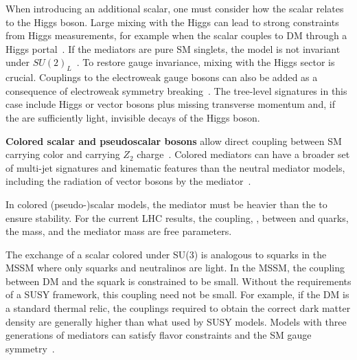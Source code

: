 When introducing an additional scalar, one must consider how the scalar relates to the Higgs boson. Large mixing with the Higgs can lead to strong constraints from Higgs measurements, for example when the scalar couples to DM through a Higgs portal~\cite{Berlin:2014cfa}. %
If the mediators are pure SM singlets, the model is not invariant under $SU(2)_L$~\cite{Bell:2016ekl}. 
To restore gauge invariance, mixing with the Higgs sector is crucial. 
Couplings to the electroweak gauge bosons can also be added as a consequence of electroweak symmetry breaking~\cite{Bauer:2016gys,Englert:2016joy}. The tree-level signatures in this case include Higgs or vector bosons plus missing transverse momentum and, if the \IP are sufficiently light, invisible decays of the Higgs boson.


\textbf{Colored scalar and pseudoscalar bosons} allow direct coupling between SM carrying color and \IP carrying $Z_2$ charge~\cite{Bai:2013iqa, Papucci:2014iwa, An:2013xka, Bell:2012rg}. Colored mediators can have a broader set of multi-jet signatures and kinematic features than the neutral mediator models, including the radiation of vector bosons by the mediator~\cite{Bell:2012rg}. 

In colored (pseudo-)scalar models, the mediator must be heavier than the \IP to ensure \IP stability. 
For the current LHC results, the coupling, \gdmq, between \IP and quarks, the \IP mass, and the mediator mass are free parameters. 

The exchange of a scalar colored under SU(3) is analogous to squarks in the MSSM where only squarks and neutralinos are light.
In the MSSM, the coupling between DM and the squark is constrained to be small\cite{Abercrombie:2015wmb}.
Without the requirements of a SUSY framework, this coupling need not be small. 
For example, if the DM is a standard thermal relic, the couplings required to obtain the correct dark matter density are generally higher than what used by SUSY models.
Models with three generations of mediators can satisfy flavor constraints and the SM gauge symmetry~\cite{Ko:2016zxg}. 

